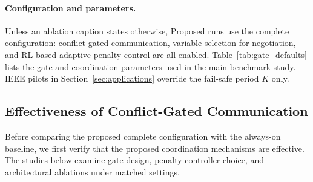 \documentclass[conference]{IEEEtran}
\begin{document}
\paragraph{Configuration and parameters.} Unless an ablation caption states otherwise, Proposed runs use the complete configuration: conflict-gated communication, variable selection for negotiation, and RL-based adaptive penalty control are all enabled. Table~\ref{tab:gate_defaults} lists the gate and coordination parameters used in the main benchmark study. IEEE pilots in Section~\ref{sec:applications} override the fail-safe period $K$ only.

\begin{table}[!t]
\centering
\scriptsize
\caption{Default gate and coordination parameters for complete Proposed runs (F1--F18 unless noted). IEEE pilots in Section~\ref{sec:applications} override $K$ only.}
\label{tab:gate_defaults}
\setlength{\tabcolsep}{3pt}
\end{table}

\subsection{Effectiveness of Conflict-Gated Communication}\label{sec:exp_ablations}\label{sec:exp_q3}
Before comparing the proposed complete configuration with the always-on baseline, we first verify that the proposed coordination mechanisms are effective. The studies below examine gate design, penalty-controller choice, and architectural ablations under matched settings.
\end{document}
